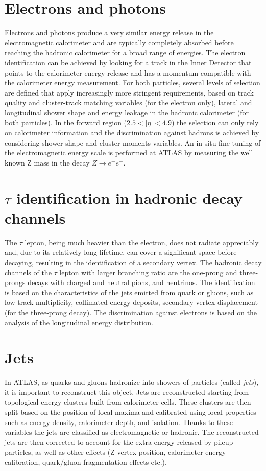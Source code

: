 \documentclass[a4paper,twoside,12pt]{book}
\begin{document}
\section{Electrons and photons}
Electrons and photons produce a very similar energy release in the electromagnetic calorimeter and are typically completely absorbed before reaching the hadronic calorimeter for a broad
 range of energies. The electron identification can be achieved by 
looking for a track in the Inner Detector that points to the calorimeter energy release and has a momentum compatible with the calorimeter energy measurement. For both particles, several levels of selection are defined that apply increasingly
more stringent requirements, based on track quality and cluster-track matching variables (for the electron only), lateral and longitudinal shower shape and energy leakage in the 
hadronic calorimeter (for both particles). In the forward region ($2.5 < |\eta| < 4.9$) the 
selection can only rely on calorimeter information and the discrimination against hadrons
is achieved by considering shower shape and cluster moments variables. An in-situ fine tuning
of the electromagnetic energy scale is performed at ATLAS by measuring the well known 
Z mass in the decay $Z \rightarrow e^+e^-$.

\section{$\tau$ identification in hadronic decay \\
channels}
The $\tau$ lepton, being much heavier than the electron, does not radiate appreciably and, due to its relatively long lifetime, can cover a significant 
space before decaying, resulting in the identification of a secondary vertex.
The hadronic decay channels of the $\tau$ lepton with larger branching ratio are the 
one-prong and three-prongs decays with charged and neutral pions, and neutrinos. The
identification is based on the characteristics of the jets emitted from quark or gluons, such 
as low track multiplicity, collimated energy deposits, secondary vertex displacement (for the
three-prong decay). The discrimination against electrons is based on the analysis
of the longitudinal energy distribution. 

\section{Jets}\label{subsec:jets}
In ATLAS, as quarks and gluons hadronize into showers of particles (called \textit{jets}), it is important to reconstruct this object. Jets are reconstructed starting from topological energy clusters built from calorimeter cells. These clusters are then split based on the position of local maxima and calibrated using
local properties such as energy density, calorimeter depth, and isolation. Thanks to these 
variables the jets are classified as electromagnetic or hadronic. The reconstructed jets are
then corrected to account for the extra energy released by pileup particles, as well as other effects (Z vertex position, calorimeter
energy calibration, quark/gluon fragmentation effects etc.).
\end{document}

